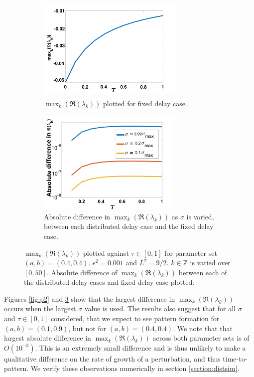 \begin{figure}[H]
    \centering
    \begin{subfigure}[t]{0.45\textwidth}
        \centering
        \includegraphics[width=7cm,height=5cm]{p3fixed.png}
        \caption{$\max_k(\Re(\lambda_k))$ plotted for fixed delay case.}
        \label{}
    \end{subfigure}
    \hfill
    \begin{subfigure}[t]{0.45\textwidth}
        \centering
        \includegraphics[width=7cm,height=5cm]{dispdiff2.png}
        \caption{Absolute difference in $\max_k(\Re(\lambda_k))$ as $\sigma$ is varied, between each distributed delay case and the fixed delay case.}
        \label{}
    \end{subfigure}
    \caption{$\max_k(\Re(\lambda_k))$ plotted against $\tau\in[0,1]$ for parameter set $(a,b)=(0.4,0.4)$. $\epsilon^2=0.001$ and $L^2=9/2$. $k\in\mathbb{Z}$ is varied over $[0,50]$. Absolute difference of $\max_k(\Re(\lambda_k))$ between each of the distributed delay cases and fixed delay case plotted.}
    \label{fig:p3}
\end{figure}

Figures \ref{fig:p2} and \ref{fig:p3} show that the largest difference in $\max_k(\Re(\lambda_k))$ occurs when the largest $\sigma$ value is used. The results also suggest that for all $\sigma$ and $\tau\in[0,1]$ considered, that we expect to see pattern formation for $(a,b)=(0.1,0.9)$, but not for $(a,b)=(0.4,0.4)$. We note that that largest absolute difference in $\max_k(\Re(\lambda_k))$ across both parameter sets is of $O(10^{-3})$. This is an extremely small difference and is thus unlikely to make a qualitative difference on the rate of growth of a perturbation, and thus time-to-pattern. We verify these observations numerically in section \ref{section:distsim}.

